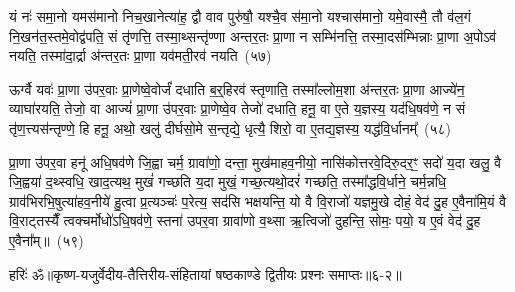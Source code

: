 यं नः॑ समा॒नो यमस॑मानो निच॒खानेत्या॑ह॒ द्वौ वाव पुरु॑षौ॒ यश्चै॒व स॑मा॒नो यश्चास॑मानो॒ यमे॒वास्मै॒ तौ व॑ल॒गं नि॒खन॑त॒स्तमे॒वोद्व॑पति॒ सं तृ॑णत्ति॒ तस्मा॒थ्सन्तृ॑ण्णा अन्तर॒तः प्रा॒णा न सम्भि॑नत्ति॒ तस्मा॒दस॑म्भिन्नाः प्रा॒णा अ॒पो\-ऽव॑ नयति॒ तस्मा॑दा॒र्द्रा अ॑न्तर॒तः प्रा॒णा यव॑मती॒रव॑ नयति~(५७)\ip

ऊर्ग्वै यवः॑ प्रा॒णा उ॑पर॒वाः प्रा॒णेष्वे॒वोर्जं॑ दधाति ब॒र्॒\mbox{}हिरव॑ स्तृणाति॒ तस्मा᳚ल्लोम॒शा अ॑न्तर॒तः प्रा॒णा आज्ये॑न॒ व्याघा॑रयति॒ तेजो॒ वा आज्यं॑ प्रा॒णा उ॑पर॒वाः प्रा॒णेष्वे॒व तेजो॑ दधाति॒ हनू॒ वा ए॒ते य॒ज्ञस्य॒ यद॑धि॒षव॑णे॒ न सं तृ॑ण॒त्त्यस॑न्तृण्णे॒ हि हनू॒ अथो॒ खलु॑ दीर्घसो॒मे स॒न्तृद्ये॒ धृत्यै॒ शिरो॒ वा ए॒तद्य॒ज्ञस्य॒ यद्ध॑वि॒र्धानम्᳚~(५८)\ip

प्रा॒णा उ॑पर॒वा हनू॑ अधि॒षव॑णे जि॒ह्वा चर्म॒ ग्रावा॑णो॒ दन्ता॒ मुख॑माहव॒नीयो॒ नासि॑कोत्तरवे॒दिरु॒दर॒ꣳ॒ सदो॑ य॒दा खलु॒ वै जि॒ह्वया॑ द॒थ्स्वधि॒ खाद॒त्यथ॒ मुखं॑ गच्छति य॒दा मुखं॒ गच्छ॒त्यथो॒दरं॑ गच्छति॒ तस्मा᳚द्\-धवि॒र्धाने॒ चर्म॒न्नधि॒ ग्राव॑भिरभि॒षुत्या॑हव॒नीये॑ हु॒त्वा प्र॒त्यञ्चः॑ प॒रेत्य॒ सद॑सि भक्षयन्ति॒ यो वै वि॒राजो॑ यज्ञमु॒खे दोहं॒ वेद॑ दु॒ह ए॒वैना॑मि॒यं वै वि॒राट्तस्यैँ त्वक्चर्मोधो॑\-ऽधि॒षव॑णे॒ स्तना॑ उपर॒वा ग्रावा॑णो व॒थ्सा ऋ॒त्विजो॑ दुहन्ति॒ सोमः॒ पयो॒ य ए॒वं वेद॑ दु॒ह ए॒वैना᳚म्॥~(५९)\ip

{}%

{हरिः॑ ॐ}{॥कृष्ण-यजुर्वेदीय-तैत्तिरीय-संहितायां षष्ठकाण्डे द्वितीयः प्रश्नः समाप्तः॥६-२॥}


